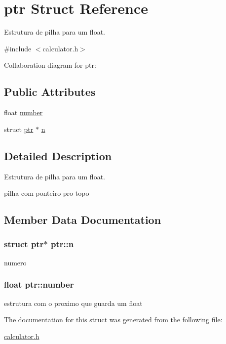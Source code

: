 \hypertarget{structptr}{}\section{ptr Struct Reference}
\label{structptr}


Estrutura de pilha para um float.  




{\ttfamily \#include $<$calculator.\+h$>$}



Collaboration diagram for ptr\+:
\subsection*{Public Attributes}
\begin{DoxyCompactItemize}
\item 
float \hyperlink{structptr_a4873f5f738de8781fd555d3f5c50cda9}{number}
\item 
struct \hyperlink{structptr}{ptr} $\ast$ \hyperlink{structptr_aa07881e8571a0e82a7a70436276303b4}{n}
\end{DoxyCompactItemize}


\subsection{Detailed Description}
Estrutura de pilha para um float. 

pilha com ponteiro pro topo 

\subsection{Member Data Documentation}
\subsubsection[{\texorpdfstring{n}{n}}]{\setlength{\rightskip}{0pt plus 5cm}struct {\bf ptr}$\ast$ ptr\+::n}\hypertarget{structptr_aa07881e8571a0e82a7a70436276303b4}{}\label{structptr_aa07881e8571a0e82a7a70436276303b4}
numero 
\subsubsection[{\texorpdfstring{number}{number}}]{\setlength{\rightskip}{0pt plus 5cm}float ptr\+::number}\hypertarget{structptr_a4873f5f738de8781fd555d3f5c50cda9}{}\label{structptr_a4873f5f738de8781fd555d3f5c50cda9}
estrutura com o proximo que guarda um float 

The documentation for this struct was generated from the following file\+:\begin{DoxyCompactItemize}
\item 
\hyperlink{calculator_8h}{calculator.\+h}\end{DoxyCompactItemize}
